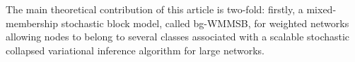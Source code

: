 The main theoretical contribution of this article is two-fold: firstly, a mixed-membership stochastic block model, called bg-WMMSB, for weighted networks allowing nodes to belong to several classes associated with a scalable stochastic collapsed variational inference algorithm for large networks.

%
%
%
%
%
%
%

